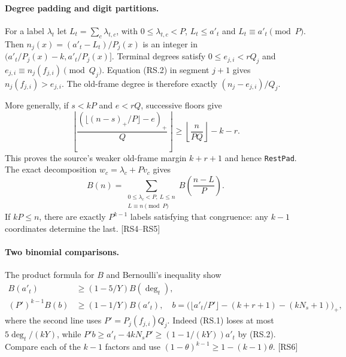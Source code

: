 \paragraph{Degree padding and digit partitions.}
For a label $\lambda_t$ let $L_t=\sum_c\lambda_{t,c}$, with
$0\le\lambda_{t,c}<P$, $L_t\le a'_t$ and $L_t\equiv a'_t\pmod P$.
Then $n_j(x)=(a'_t-L_t)/P_j(x)$ is an integer in
$(a'_t/P_j(x)-k,a'_t/P_j(x)]$. Terminal degrees satisfy
$0\le e_{j,i}<rQ_j$ and $e_{j,i}\equiv n_j(f_{j,i})\pmod{Q_j}$.
Equation (RS.2) in segment $j+1$ gives $n_j(f_{j,i})>e_{j,i}$.
The old-frame degree is therefore exactly $(n_j-e_{j,i})/Q_j$.

More generally, if $s<kP$ and $e<rQ$, successive floors give
\[
 \left\lfloor\frac{(\lfloor(n-s)_+/P\rfloor-e)_+}{Q}\right\rfloor
 \ge\left\lfloor\frac n{PQ}\right\rfloor-k-r.
\]
This proves the source's weaker old-frame margin $k+r+1$ and hence
\texttt{RestPad}. The exact decomposition $w_c=\lambda_c+Pv_c$ gives
\[
 B(n)=\sum_{\substack{0\le\lambda_c<P,\ L\le n\\L\equiv n\pmod P}}
 B\!\left(\frac{n-L}{P}\right).
 \tag{RS.4}
\]
If $kP\le n$, there are exactly $P^{k-1}$ labels satisfying that
congruence: any $k-1$ coordinates determine the last. \textsf{[RS4--RS5]}

\paragraph{Two binomial comparisons.}
The product formula for $B$ and Bernoulli's inequality show
\[
\begin{split}
 B(a'_t)&\ge(1-5/Y)B(\deg_t),\\
 (P')^{k-1}B(b)&\ge(1-1/Y)B(a'_t),
 \quad b=\bigl(\lfloor a'_t/P'\rfloor-(k+r+1)-(kN_s+1)\bigr)_+,
\end{split}\tag{RS.5}
\]
where the second line uses $P'=P_j(f_{j,i})Q_j$.
Indeed (RS.1) loses at most $5\deg_t/(kY)$, while
$P'b\ge a'_t-4kN_sP'\ge(1-1/(kY))a'_t$ by (RS.2).
Compare each of the $k-1$ factors and use $(1-\theta)^{k-1}\ge1-(k-1)\theta$.
\textsf{[RS6]}

